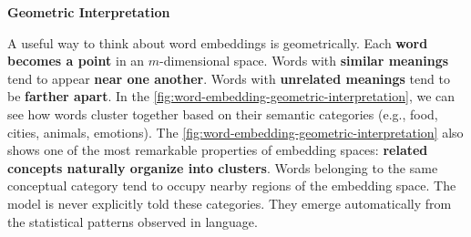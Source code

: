 \highspace
\begin{flushleft}
    \textcolor{Green3}{ \textbf{Geometric Interpretation}}
\end{flushleft}
A useful way to think about word embeddings is geometrically. Each \textbf{word becomes a point} in an $m$-dimensional space. Words with \textbf{similar meanings} tend to appear \textbf{near one another}. Words with \textbf{unrelated meanings} tend to be \textbf{farther apart}. In the \autoref{fig:word-embedding-geometric-interpretation}, we can see how words cluster together based on their semantic categories (e.g., food, cities, animals, emotions). The \autoref{fig:word-embedding-geometric-interpretation} also shows one of the most remarkable properties of embedding spaces: \textbf{related concepts naturally organize into clusters}. Words belonging to the same conceptual category tend to occupy nearby regions of the embedding space. The model is never explicitly told these categories. They emerge automatically from the statistical patterns observed in language.

